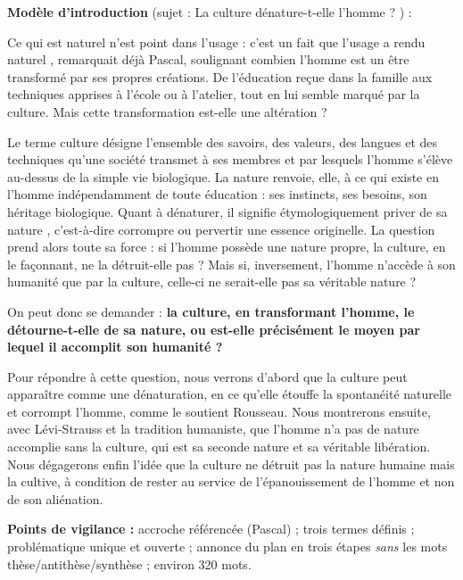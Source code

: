\documentclass[11pt]{article}
\newcommand{\cle}[1]{{\popxbold\color{popdark}#1}}
\begin{document}
\begin{corrige}
\textbf{Modèle d'introduction} (sujet : \og La culture dénature-t-elle l'homme ? \fg{}) :

\medskip
\og Ce qui est naturel n'est point dans l'usage : c'est un fait que l'usage a rendu naturel \fg{}, remarquait déjà Pascal, soulignant combien l'homme est un être transformé par ses propres créations. De l'éducation reçue dans la famille aux techniques apprises à l'école ou à l'atelier, tout en lui semble marqué par la culture. Mais cette transformation est-elle une altération ?

Le terme \cle{culture} désigne l'ensemble des savoirs, des valeurs, des langues et des techniques qu'une société transmet à ses membres et par lesquels l'homme s'élève au-dessus de la simple vie biologique. La \cle{nature} renvoie, elle, à ce qui existe en l'homme indépendamment de toute éducation : ses instincts, ses besoins, son héritage biologique. Quant à \cle{dénaturer}, il signifie étymologiquement \og priver de sa nature \fg{}, c'est-à-dire corrompre ou pervertir une essence originelle. La question prend alors toute sa force : si l'homme possède une nature propre, la culture, en le façonnant, ne la détruit-elle pas ? Mais si, inversement, l'homme n'accède à son humanité que par la culture, celle-ci ne serait-elle pas sa véritable nature ?

On peut donc se demander : \textbf{la culture, en transformant l'homme, le détourne-t-elle de sa nature, ou est-elle précisément le moyen par lequel il accomplit son humanité ?}

Pour répondre à cette question, nous verrons d'abord que la culture peut apparaître comme une dénaturation, en ce qu'elle étouffe la spontanéité naturelle et corrompt l'homme, comme le soutient Rousseau. Nous montrerons ensuite, avec Lévi-Strauss et la tradition humaniste, que l'homme n'a pas de nature accomplie sans la culture, qui est sa seconde nature et sa véritable libération. Nous dégagerons enfin l'idée que la culture ne détruit pas la nature humaine mais la cultive, à condition de rester au service de l'épanouissement de l'homme et non de son aliénation.

\medskip
\textbf{Points de vigilance :} accroche référencée (Pascal) ; trois termes définis ; problématique unique et ouverte ; annonce du plan en trois étapes \emph{sans} les mots \og thèse/antithèse/synthèse \fg{} ; environ 320 mots.
\end{corrige}
\end{document}
